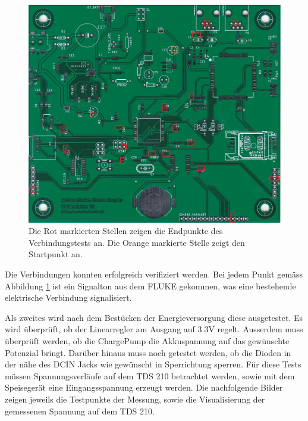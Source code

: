 \begin{figure}[h]
\centering
\includegraphics[width=0.9\linewidth]{graphics/HW_Val/Verbindungstestpunkte.jpg}
\caption{Die Rot markierten Stellen zeigen die Endpunkte des Verbindungstests an. Die Orange markierte Stelle zeigt den Startpunkt an.}
\label{fig:Verbindungstestpunkte}
\end{figure}

Die Verbindungen konnten erfolgreich verifiziert werden. Bei jedem Punkt gemäss Abbildung \ref{fig:Verbindungstestpunkte} ist ein Signalton aus dem FLUKE gekommen, was eine bestehende elektrische Verbindung signalisiert.

Als zweites wird nach dem Bestücken der Energieversorgung diese ausgetestet. Es wird überprüft, ob der Linearregler am Ausgang auf 3.3V regelt. Ausserdem muss überprüft werden, ob die ChargePump die Akkuspannung auf das gewünschte Potenzial bringt. Darüber hinaus muss noch getestet werden, ob die Dioden in der nähe des DCIN Jacks wie gewünscht in Sperrichtung sperren. Für diese Tests müssen Spannungsverläufe auf dem TDS 210 betrachtet werden, sowie mit dem Speisegerät eine Eingangsspannung erzeugt werden. Die nachfolgende Bilder zeigen jeweils die Testpunkte der Messung, sowie die Visualisierung der gemessenen Spannung auf dem TDS 210.\\[0.5cm]

